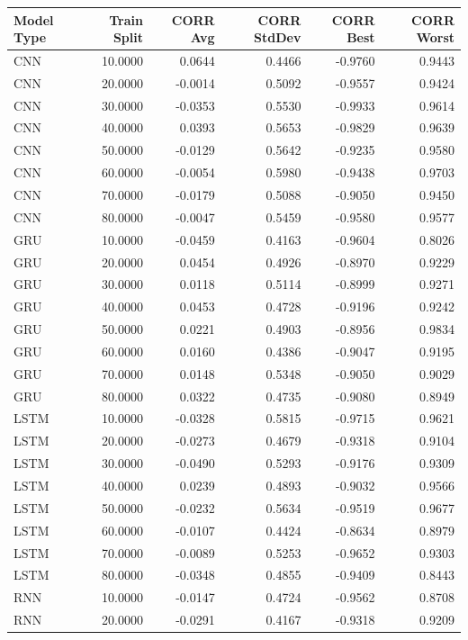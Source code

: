 \begin{tabular}{lrrrrr}
\toprule
Model Type & Train Split & CORR Avg & CORR StdDev & CORR Best & CORR Worst \\
\midrule
CNN & 10.0000 & 0.0644 & 0.4466 & -0.9760 & 0.9443 \\
CNN & 20.0000 & -0.0014 & 0.5092 & -0.9557 & 0.9424 \\
CNN & 30.0000 & -0.0353 & 0.5530 & -0.9933 & 0.9614 \\
CNN & 40.0000 & 0.0393 & 0.5653 & -0.9829 & 0.9639 \\
CNN & 50.0000 & -0.0129 & 0.5642 & -0.9235 & 0.9580 \\
CNN & 60.0000 & -0.0054 & 0.5980 & -0.9438 & 0.9703 \\
CNN & 70.0000 & -0.0179 & 0.5088 & -0.9050 & 0.9450 \\
CNN & 80.0000 & -0.0047 & 0.5459 & -0.9580 & 0.9577 \\
GRU & 10.0000 & -0.0459 & 0.4163 & -0.9604 & 0.8026 \\
GRU & 20.0000 & 0.0454 & 0.4926 & -0.8970 & 0.9229 \\
GRU & 30.0000 & 0.0118 & 0.5114 & -0.8999 & 0.9271 \\
GRU & 40.0000 & 0.0453 & 0.4728 & -0.9196 & 0.9242 \\
GRU & 50.0000 & 0.0221 & 0.4903 & -0.8956 & 0.9834 \\
GRU & 60.0000 & 0.0160 & 0.4386 & -0.9047 & 0.9195 \\
GRU & 70.0000 & 0.0148 & 0.5348 & -0.9050 & 0.9029 \\
GRU & 80.0000 & 0.0322 & 0.4735 & -0.9080 & 0.8949 \\
LSTM & 10.0000 & -0.0328 & 0.5815 & -0.9715 & 0.9621 \\
LSTM & 20.0000 & -0.0273 & 0.4679 & -0.9318 & 0.9104 \\
LSTM & 30.0000 & -0.0490 & 0.5293 & -0.9176 & 0.9309 \\
LSTM & 40.0000 & 0.0239 & 0.4893 & -0.9032 & 0.9566 \\
LSTM & 50.0000 & -0.0232 & 0.5634 & -0.9519 & 0.9677 \\
LSTM & 60.0000 & -0.0107 & 0.4424 & -0.8634 & 0.8979 \\
LSTM & 70.0000 & -0.0089 & 0.5253 & -0.9652 & 0.9303 \\
LSTM & 80.0000 & -0.0348 & 0.4855 & -0.9409 & 0.8443 \\
RNN & 10.0000 & -0.0147 & 0.4724 & -0.9562 & 0.8708 \\
RNN & 20.0000 & -0.0291 & 0.4167 & -0.9318 & 0.9209 \\

\end{tabular}
